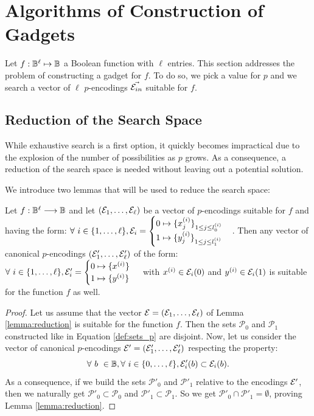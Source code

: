 \section{Algorithms of Construction of Gadgets}
\label{sec:p_encodings_search}

Let $f: \mathbb{B}^\ell \mapsto \mathbb{B}$ a Boolean function with $\ell$ entries. This section addresses the problem of constructing a gadget for $f$. To do so, we pick a value for $p$ and we search a vector of $\ell$ $p$-encodings $\Vec{\mathcal{E}_{in}}$ suitable for $f$. 

\subsection{Reduction of the Search Space}
\label{sec:restriction}

While exhaustive search is a first option, it quickly becomes impractical due to the explosion of the number of possibilities as $p$ grows. As a consequence, a reduction of the search space is needed without leaving out a potential solution.

We introduce two lemmas that will be used to reduce the search space:

\begin{lemma} 
    Let $f: \mathbb{B}^\ell \longrightarrow \mathbb{B}$ and let $(\mathcal{E}_1, \dots, \mathcal{E}_\ell)$ be a vector of $p$-encodings suitable for $f$ and having the form:
    $\forall~i \in \{1, \dots, \ell\}, \mathcal{E}_i = \begin{cases} 0 \mapsto \{x_j^{(i)}\}_{1 \le j \le l_0^{(i)}} \\ 1 \mapsto \{y_j^{(i)}\}_{1 \le j \le l_1^{(i)}} \end{cases}$.
    Then any vector of canonical $p$-encodings $(\mathcal{E}'_1, \dots, \mathcal{E}'_\ell)$ of the form: $ \forall~i \in \{1, \dots, \ell\}, \mathcal{E}'_i = \begin{cases} 0 \mapsto \{x^{(i)}\} \\ 1 \mapsto \{y^{(i)}\} \end{cases}$ with $x^{(i)} \in \mathcal{E}_i(0)$ and $ y^{(i)} \in \mathcal{E}_i(1)$ is suitable for the function $f$ as well.
    \label{lemma:reduction}
\end{lemma}


\begin{proof}
Let us assume that the vector $\mathcal{E} = (\mathcal{E}_1, \dots, \mathcal{E}_\ell)$ of Lemma \ref{lemma:reduction} is suitable for the function $f$. Then the sets $\mathcal{P}_0$ and $\mathcal{P}_1$ constructed like in Equation \ref{def:sets_p} are disjoint.
Now, let us consider the vector of canonical $p$-encodings $\mathcal{E}' = (\mathcal{E}'_1, \dots, \mathcal{E}'_\ell)$ respecting the property:
$$
\forall~b \ \in \mathbb{B}, \forall 
~i \in \{0, \dots, \ell\}, \mathcal{E}'_i(b) \subset \mathcal{E}_i(b).
$$
As a consequence, if we build the sets $\mathcal{P'}_0$ and $\mathcal{P'}_1$ relative to the encodings $\mathcal{E}'$, then we naturally get $\mathcal{P'}_0 \subset \mathcal{P}_0$ and $\mathcal{P'}_1 \subset \mathcal{P}_1$. So we get $\mathcal{P'}_0 \cap \mathcal{P'}_1 = \emptyset$, proving Lemma \ref{lemma:reduction}.
\end{proof}


